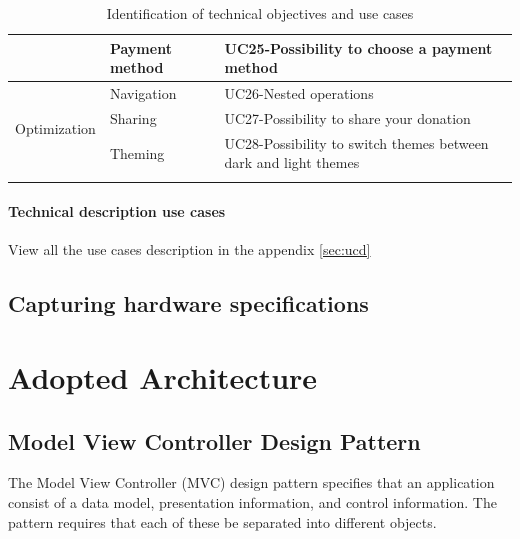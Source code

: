 \begin{longtable}{|m{10em}|m{10em}|m{10em}|}
                                           & \multirow{1}{*}{Payment method}          & UC25-Possibility to choose a payment method                     \\\hline
      \multirow{3}{*}{Optimization}        & \multirow{1}{*}{Navigation}              & UC26-Nested operations                                          \\\cline{2-3}
                                           & \multirow{1}{*}{Sharing}                 & UC27-Possibility to share your donation                         \\\cline{2-3}
                                           & \multirow{1}{*}{Theming}                 & UC28-Possibility to switch themes between dark and light themes \\\hline

      \caption{Identification of technical objectives and use cases}
      \label{tab:id_tech_objec_uc}
\end{longtable}

\paragraph{ Technical description use cases }
View all the use cases description in the appendix \ref{sec:ucd}


\subsection{Capturing hardware specifications}


\section{Adopted Architecture}

\subsection{Model View Controller Design Pattern}

The Model View Controller (MVC) design pattern specifies that an application consist of a data model, presentation information, and control information. The pattern requires that each of these be separated into different objects.

